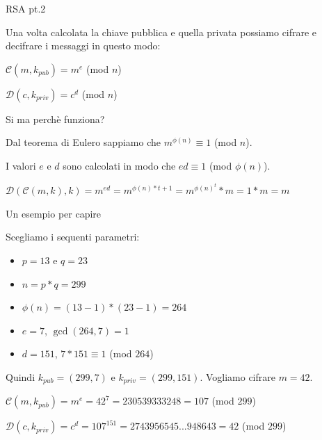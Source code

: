 \documentclass[xcolor=dvipsnames,aspectratio=169]{beamer}
\begin{document}
\begin{frame}{RSA pt.2}

Una volta calcolata la chiave pubblica e quella privata possiamo cifrare e decifrare i messaggi in questo modo:

\pause
\medskip

$\mathcal{C}(m, k_{pub}) = m^{e} $ (mod $n$) \pause
  
$\mathcal{D}(c, k_{priv}) = c^{d} $ (mod $n$)

\medskip

\pause

Si ma perchè funziona?

\medskip

\pause

Dal teorema di Eulero sappiamo che $m^{\phi(n)} \equiv 1 $ (mod $n$).

I valori $e$ e $d$ sono calcolati in modo che $ed \equiv 1$ (mod $\phi(n)$).

\medskip

$\mathcal{D}(\mathcal{C}(m, k), k) = m^{ed} = m^{\phi(n)*t + 1} = m^{\phi(n)^{t}} * m = 1 * m = m$

\end{frame}

\begin{frame}{Un esempio per capire}
  
\pause

  Scegliamo i sequenti parametri:
  
  \begin{itemize}
    \item $p = 13$ e $q = 23$
    \item $n = p*q = 299$
    \item $\phi(n) = (13-1)*(23-1) = 264$
    \item $e = 7$, $\gcd(264, 7) = 1$
    \item $d = 151$, $7*151 \equiv 1 $ (mod $264$)
  \end{itemize}
  
  \smallskip
  
\pause

  Quindi $k_{pub} = (299, 7)$ e $k_{priv} = (299, 151)$. Vogliamo cifrare $m = 42$.
  
\pause

  \medskip
  
  $\mathcal{C}(m, k_{pub}) = m^{e} = 42^7 = 230539333248 = 107$ (mod $299$) 
 
 \pause
  
  $\mathcal{D}(c, k_{priv}) = c^{d} = 107^{151} = 2743956545...948643 = 42 $ (mod $299$)

\end{frame}
\end{document}

